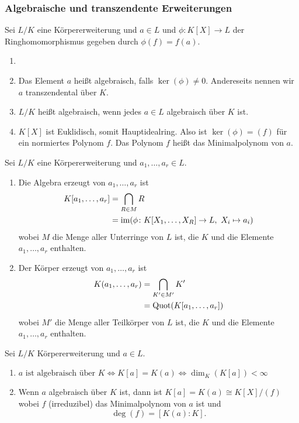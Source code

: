 \subsubsection{Algebraische und transzendente Erweiterungen}
\begin{Def}Sei $L/K$ eine Körpererweiterung und $a\in L$ und $\phi\colon K[X]\to L$ der Ringhomomorphismus gegeben durch $\phi(f)=f(a)$.
    \begin{enumerate}
        \item []
        \item  Das Element $a$ heißt algebraisch, falls $\ker(\phi)\neq 0$. Andereseits nennen wir $a$ transzendental über $K$.
        \item $L/K$ heißt algebraisch, wenn jedes $a\in L$ algebraisch über $K$ ist.
        \item  $K[X]$ ist Euklidisch, somit Hauptidealring. Also ist $\ker(\phi)=(f)$ für ein normiertes Polynom $f$. Das Polynom $f$ heißt das Minimalpolynom von $a$.
    \end{enumerate}
\end{Def}
\begin{Def}
    Sei $L/K$ eine Körpererweiterung und $a_1,\dots,a_r\in L$.
    \begin{enumerate}
        \item Die Algebra erzeugt von $a_1,\dots,a_r$ ist \begin{align*} 
        K[a_1,\dots,a_r]&=\bigcap\limits_{R\in M}R\\
        &=\operatorname{im}(\phi\colon K[X_1,\dots,X_R]\to L,\ X_i\mapsto a_i)
        \end{align*} wobei $M$ die Menge aller Unterringe von $L$ ist, die $K$ und die Elemente $a_1,\dots,a_r$ enthalten.
        \item Der Körper erzeugt von $a_1,\dots,a_r$ ist \begin{align*} 
        K(a_1,\dots,a_r)&=\bigcap\limits_{K'\in M'}K'\\
        &=\operatorname{Quot}(K[a_1,\dots,a_r])
        \end{align*} wobei $M'$ die Menge aller Teilkörper von $L$ ist, die $K$ und die Elemente $a_1,\dots,a_r$ enthalten.
    \end{enumerate}
\end{Def}
\begin{Satz}
    Sei $L/K$ Körpererweiterung und $a\in L$.
    \begin{enumerate}
        \item $a \text{ ist algebraisch über }K \iff K[a]=K(a)\iff \dim_K(K[a])<\infty$
        \item Wenn $a$ algebraisch über $K$ ist, dann ist $K[a]=K(a)\cong K[X]/(f)$ wobei $f$ (irreduzibel) das Minimalpolynom von $a$ ist und $$\deg(f)=[K(a):K].$$
    \end{enumerate}
\end{Satz}
